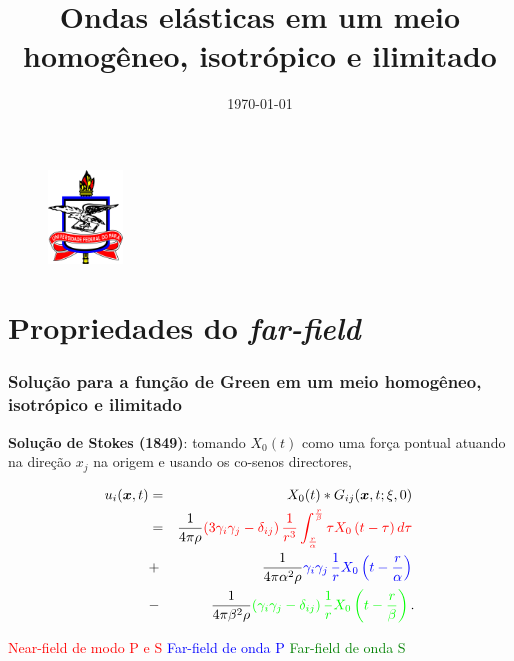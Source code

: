 \documentclass{beamer}
\title[Seminário]{Ondas elásticas em um meio homogêneo, isotrópico e ilimitado} %
\author{} %
\institute[UFPA] %
{
	Professor: Jessé Costa\\
Universidade Federal do Pará \\ %
\medskip
}
\date{\today} %
\newcommand{\xvec}{\vc{x}}
\newcommand{\xivec}{\boldmath \xi}
\begin{document}
 \begin{frame}
\begin{figure}[htb]
\centering
\includegraphics[width= 2cm, height= 2.5cm]{logo.jpg}
\end{figure}

\titlepage
\end{frame}



\section{Propriedades do \textit{far-field}}

\begin{frame}
	\frametitle{\textbf{Solu\c{c}\~ao para a fun\c{c}\~ao de Green em um meio homog\^eneo, isotr\'opico e ilimitado}}
	
	\begin{flushleft}
		\textbf{Solu\c{c}\~ao de Stokes (1849)}: tomando $X_{0}(t)$ como uma for\c{c}a pontual atuando na dire\c{c}\~ao $x_j$ na origem e usando os co-senos 
		directores,
	\end{flushleft}
	\begin{eqnarray*}
		\label{ten1}
		u_i(\xvec,t) &=& X_{0}(t) * G_{ij}(\xvec,t;\xivec,0)\, \\
		&=&\frac{1}{4\pi\rho} \textcolor{red}{\left(3\gamma_i\gamma_j -\delta_{ij} \right) \frac{1}{r^3}  \int_{ \frac{r }{\alpha}}^{ \frac{r}{\beta}} \tau X_{0}\left( t -\tau \right)  d\tau }\, \\      
		&+&\frac{1}{4\pi\alpha^2\rho} \textcolor{blue}{\gamma_i\gamma_j\, \frac{1}{r}  X_{0}\left(t - \frac{r}{\alpha} \right) }\, \\
		&-&\frac{1}{4\pi\beta^2\rho} \textcolor{green}{\left(\gamma_i\gamma_j -\delta_{ij} \right)  \frac{1}{r}  X_{0}\left(t - \frac{r}{\beta} \right) }\, .
	\end{eqnarray*}
	\begin{flushleft}
		\textcolor{red}{Near-field de modo P e S} \hspace{0.5cm}
		\textcolor{blue}{Far-field de onda P}\hspace{0.5cm}
		\textcolor{green}{Far-field de onda S}
	\end{flushleft}
\end{frame}%
\end{document}
